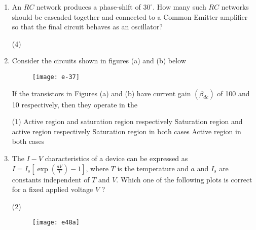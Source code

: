 \begin{enumerate}
	{	}
	\begin{tasks}(2)
		\task[\textbf{A.}] $\frac{1}{2} V_{i} V_{r} \cos \left(\theta_{i}-\theta_{r}\right)$
		\task[\textbf{B.}] $V_{i} V_{r}\left[\cos \left(\theta_{i}-\theta_{r}\right)-\cos \left(\frac{1}{2} \omega t+\theta_{i}+\theta_{r}\right)\right]$
		\task[\textbf{C.}] $V_{i} V_{r} \sin \left(\theta_{i}-\theta_{r}\right)$
		\task[\textbf{D.}] $V_{i} V_{r}\left[\cos \left(\theta_{i}-\theta_{r}\right)+\cos \left(\frac{1}{2} \omega t+\theta_{i}+\theta_{r}\right)\right]$
	\end{tasks}
	\item An $R C$ network produces a phase-shift of $30^{\circ}$. How many such $R C$ networks should be cascaded together and connected to a Common Emitter amplifier so that the final circuit behaves as an oscillator?
	{	}
	\begin{tasks}(4)
	\end{tasks}
	\item Consider the circuits shown in figures (a) and (b) below\\
	\begin{figure}[H]
		\centering
		\texttt{[image: e-37]}
	\end{figure}
	If the transistors in Figures (a) and (b) have current gain $\left(\beta_{d c}\right)$ of 100 and 10 respectively, then they operate in the
	{	}
	\begin{tasks}(1)
		\task[\textbf{A.}] Active region and saturation region respectively
		\task[\textbf{B.}] Saturation region and active region respectively
		\task[\textbf{C.}] Saturation region in both cases
		\task[\textbf{D.}]  Active region in both cases
	\end{tasks}
	\item The $I-V$ characteristics of a device can be expressed as $I=I_{s}\left[\exp \left(\frac{a V}{T}\right)-1\right]$, where $T$ is the temperature and $a$ and $I_{s}$ are constants independent of $T$ and $V$. Which one of the following plots is correct for a fixed applied voltage $V$ ?
	{	}
	\begin{tasks}(2)
		\task[\textbf{A.}] \begin{figure}[H]
			\centering
			\texttt{[image: e48a]}
		\end{figure}
		\task[\textbf{B.}] \begin{figure}[H]

\end{figure}
\end{tasks}
\end{enumerate}
